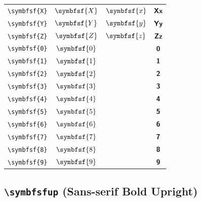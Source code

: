 \documentclass[12pt,a4paper]{article}
\begin{document}
\begin{longtable}{|c|c|c|c|}
\verb|\symbfsf{X}| & $\symbfsf{X}$ & $\symbfsf{x}$ & $ 𝗫 𝘅 $ \\
\verb|\symbfsf{Y}| & $\symbfsf{Y}$ & $\symbfsf{y}$ & $ 𝗬 𝘆 $ \\
\verb|\symbfsf{Z}| & $\symbfsf{Z}$ & $\symbfsf{z}$ & $ 𝗭 𝘇 $ \\
\verb|\symbfsf{0}| & $\symbfsf{0}$ & & $ 𝟬 $ \\
\verb|\symbfsf{1}| & $\symbfsf{1}$ & & $ 𝟭 $ \\
\verb|\symbfsf{2}| & $\symbfsf{2}$ & & $ 𝟮 $ \\
\verb|\symbfsf{3}| & $\symbfsf{3}$ & & $ 𝟯 $ \\
\verb|\symbfsf{4}| & $\symbfsf{4}$ & & $ 𝟰 $ \\
\verb|\symbfsf{5}| & $\symbfsf{5}$ & & $ 𝟱 $ \\
\verb|\symbfsf{6}| & $\symbfsf{6}$ & & $ 𝟲 $ \\
\verb|\symbfsf{7}| & $\symbfsf{7}$ & & $ 𝟳 $ \\
\verb|\symbfsf{8}| & $\symbfsf{8}$ & & $ 𝟴 $ \\
\verb|\symbfsf{9}| & $\symbfsf{9}$ & & $ 𝟵 $ \\
\hline
\end{longtable}

\newpage

\subsection*{\texttt{\textbackslash{}symbfsfup} (Sans-serif Bold Upright)}
\end{document}
